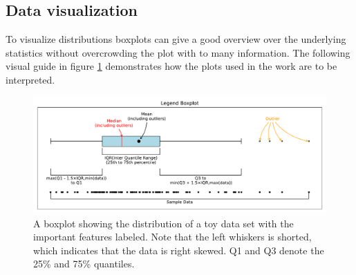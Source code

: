 \subsection{Data visualization}\label{boxplots}
To visualize distributions boxplots can give a good overview over the underlying statistics without overcrowding the plot with to many information. The following visual guide in figure \ref{fig:boxplots_legends} demonstrates how the plots used in the work are to be interpreted.
\begin{figure}[H]
    \centering
    \includegraphics[width=1.\textwidth]{chapters/foundations/images_foundation/legend_boxplot}
    \caption{A boxplot showing the distribution of a toy data set with the important features labeled. Note that the left whiskers is shorted, which indicates that the data is right skewed. Q1 and Q3 denote the 25\% and 75\% quantiles.}\label{fig:boxplots_legends}
\end{figure}